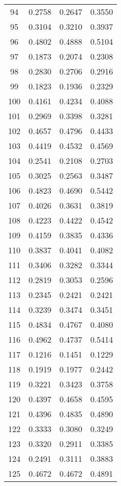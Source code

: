\begin{table}[ht]
\begin{tabular}{|c|c|c|c|}
94  &  0.2758   &  0.2647   &  0.3550 \\ 
95  &  0.3104   &  0.3210   &  0.3937 \\ 
96  &  0.4802   &  0.4888   &  0.5104 \\ 
97  &  0.1873   &  0.2074   &  0.2308 \\ 
98  &  0.2830   &  0.2706   &  0.2916 \\ 
99  &  0.1823   &  0.1936   &  0.2329 \\ 
100  &  0.4161   &  0.4234   &  0.4088 \\ 
101  &  0.2969   &  0.3398   &  0.3281 \\ 
102  &  0.4657   &  0.4796   &  0.4433 \\ 
103  &  0.4419   &  0.4532   &  0.4569 \\ 
104  &  0.2541   &  0.2108   &  0.2703 \\ 
105  &  0.3025   &  0.2563   &  0.3487 \\ 
106  &  0.4823   &  0.4690   &  0.5442 \\ 
107  &  0.4026   &  0.3631   &  0.3819 \\ 
108  &  0.4223   &  0.4422   &  0.4542 \\ 
109  &  0.4159   &  0.3835   &  0.4336 \\ 
110  &  0.3837   &  0.4041   &  0.4082 \\ 
111  &  0.3406   &  0.3282   &  0.3344 \\ 
112  &  0.2819   &  0.3053   &  0.2596 \\ 
113  &  0.2345   &  0.2421   &  0.2421 \\ 
114  &  0.3239   &  0.3474   &  0.3451 \\ 
115  &  0.4834   &  0.4767   &  0.4080 \\ 
116  &  0.4962   &  0.4737   &  0.5414 \\ 
117  &  0.1216   &  0.1451   &  0.1229 \\ 
118  &  0.1919   &  0.1977   &  0.2442 \\ 
119  &  0.3221   &  0.3423   &  0.3758 \\ 
120  &  0.4397   &  0.4658   &  0.4595 \\ 
121  &  0.4396   &  0.4835   &  0.4890 \\ 
122  &  0.3333   &  0.3080   &  0.3249 \\ 
123  &  0.3320   &  0.2911   &  0.3385 \\ 
124  &  0.2491   &  0.3111   &  0.3883 \\ 
125  &  0.4672   &  0.4672   &  0.4891 \\ 

\end{tabular}
\end{table}
